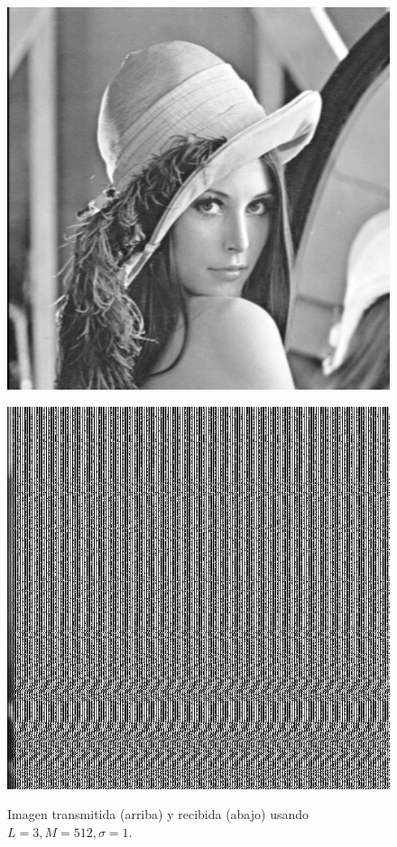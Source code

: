 \documentclass[10pt,journal,compsoc]{IEEEtran}
\begin{document}
\begin{figure}
\begin{center}
\label{fig:refuerzos2}
\centering
\begin{minipage}{.5\textwidth}
  \centering

  \includegraphics[scale=0.25]{../512/3/imgTrans.jpg}
  \label{fig:sub1}
\end{minipage}
\vspace{0cm}
\begin{minipage}{.5\textwidth}
  \centering
  \includegraphics[scale=0.25]{../512/3/imgRec.jpg}
  \label{fig:sub2}
\end{minipage}
\caption{Imagen transmitida (arriba) y recibida (abajo) usando $L=3 , M=512, \sigma=1$.}
\label{fig:test}
\end{center}
\end{figure}
\end{document}
